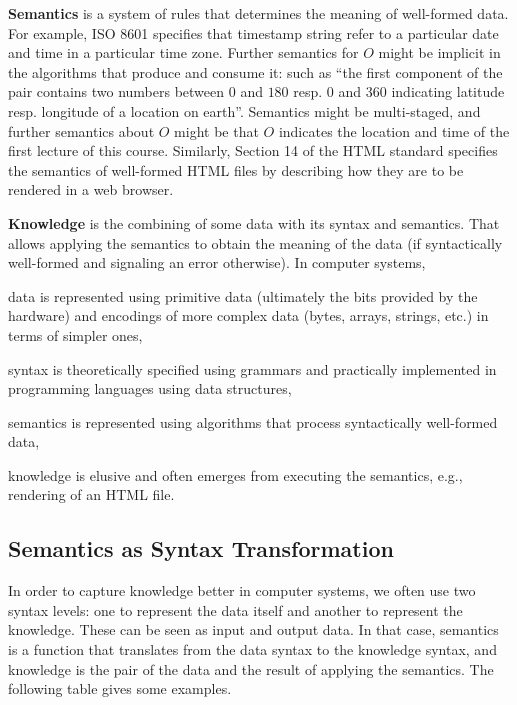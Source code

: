 \textbf{Semantics} is a system of rules that determines the meaning of well-formed data.
For example, ISO 8601 specifies that timestamp string refer to a particular date and time in a particular time zone.
Further semantics for $O$ might be implicit in the algorithms that produce and consume it: such as ``the first component of the pair contains two numbers between $0$ and $180$ resp. $0$ and $360$ indicating latitude resp. longitude of a location on earth''.
Semantics might be multi-staged, and further semantics about $O$ might be that $O$ indicates the location and time of the first lecture of this course.
Similarly, Section 14 of the HTML standard specifies the semantics of well-formed HTML files by describing how they are to be rendered in a web browser.

\textbf{Knowledge} is the combining of some data with its syntax and semantics.
That allows applying the semantics to obtain the meaning of the data (if syntactically well-formed and signaling an error otherwise).
In computer systems,
\begin{compactitem}
 \item data is represented using primitive data (ultimately the bits provided by the hardware) and encodings of more complex data (bytes, arrays, strings, etc.) in terms of simpler ones,
 \item syntax is theoretically specified using grammars and practically implemented in programming languages using data structures,
 \item semantics is represented using algorithms that process syntactically well-formed data,
 \item knowledge is elusive and often emerges from executing the semantics, e.g., rendering of an HTML file.
\end{compactitem}

\subsection{Semantics as Syntax Transformation}

In order to capture knowledge better in computer systems, we often use two syntax levels: one to represent the data itself and another to represent the knowledge.
These can be seen as input and output data.
In that case, semantics is a function that translates from the data syntax to the knowledge syntax, and knowledge is the pair of the data and the result of applying the semantics.
The following table gives some examples.

